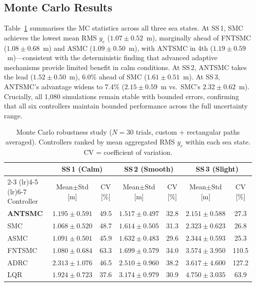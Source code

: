 \documentclass[review]{cas-dc}
\begin{document}
\subsection{Monte Carlo Results}

Table~\ref{tab:mc} summarises the MC statistics across all three sea states. At SS\,1, SMC achieves the lowest mean RMS $y_e$ ($1.07 \pm 0.52$~m), marginally ahead of FNTSMC ($1.08 \pm 0.68$~m) and ASMC ($1.09 \pm 0.50$~m), with ANTSMC in 4th ($1.19 \pm 0.59$~m)---consistent with the deterministic finding that advanced adaptive mechanisms provide limited benefit in calm conditions. At SS\,2, ANTSMC takes the lead ($1.52 \pm 0.50$~m), 6.0\% ahead of SMC ($1.61 \pm 0.51$~m). At SS\,3, ANTSMC's advantage widens to 7.4\% ($2.15 \pm 0.59$~m vs.\ SMC's $2.32 \pm 0.62$~m). Crucially, all 1{,}080 simulations remain stable with bounded errors, confirming that all six controllers maintain bounded performance across the full uncertainty range.

\begin{table}[t]
\centering
\caption{Monte Carlo robustness study ($N = 30$ trials, custom $+$ rectangular paths averaged). Controllers ranked by mean aggregated RMS $y_e$ within each sea state. CV = coefficient of variation.}
\label{tab:mc}
\setlength{\tabcolsep}{4pt}
\begin{tabular}{lcccccc}
\toprule
 & \multicolumn{2}{c}{SS\,1 (Calm)} & \multicolumn{2}{c}{SS\,2 (Smooth)} & \multicolumn{2}{c}{SS\,3 (Slight)} \\
\cmidrule(lr){2-3} \cmidrule(lr){4-5} \cmidrule(lr){6-7}
Controller & Mean$\pm$Std [m] & CV [\%] & Mean$\pm$Std [m] & CV [\%] & Mean$\pm$Std [m] & CV [\%] \\
\midrule
\textbf{ANTSMC} & $1.195 \pm 0.591$ & 49.5 & $\mathbf{1.517 \pm 0.497}$ & 32.8 & $\mathbf{2.151 \pm 0.588}$ & 27.3 \\
SMC    & $\mathbf{1.068 \pm 0.520}$ & 48.7 & $1.614 \pm 0.505$ & 31.3 & $2.323 \pm 0.623$ & 26.8 \\
ASMC   & $1.091 \pm 0.501$ & 45.9 & $1.632 \pm 0.483$ & 29.6 & $2.344 \pm 0.593$ & 25.3 \\
FNTSMC & $1.080 \pm 0.684$ & 63.3 & $1.699 \pm 0.579$ & 34.0 & $3.574 \pm 3.950$ & 110.5 \\
ADRC   & $2.313 \pm 1.076$ & 46.5 & $2.510 \pm 0.960$ & 38.2 & $3.617 \pm 4.600$ & 127.2 \\
LQR    & $1.924 \pm 0.723$ & 37.6 & $3.174 \pm 0.979$ & 30.9 & $4.750 \pm 3.035$ & 63.9 \\
\bottomrule
\end{tabular}
\end{table}
\end{document}
